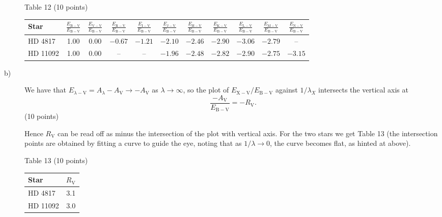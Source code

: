 \begin{description}
  \begin{center}
  Table 12 (10 points)

  \begin{tabular}{|l|c|c|c|c|c|c|c|c|c|c|}
  \hline
  Star & $\frac{E_{\mathrm{B-V}}}{E_{\mathrm{B-V}}}$
    & $\frac{E_{\mathrm{V-V}}}{E_{\mathrm{B-V}}}$
    & $\frac{E_{\mathrm{R-V}}}{E_{\mathrm{B-V}}}$
    & $\frac{E_{\mathrm{I-V}}}{E_{\mathrm{B-V}}}$
    & $\frac{E_{\mathrm{J-V}}}{E_{\mathrm{B-V}}}$
    & $\frac{E_{\mathrm{H-V}}}{E_{\mathrm{B-V}}}$
    & $\frac{E_{\mathrm{K-V}}}{E_{\mathrm{B-V}}}$
    & $\frac{E_{\mathrm{L-V}}}{E_{\mathrm{B-V}}}$
    & $\frac{E_{\mathrm{M-V}}}{E_{\mathrm{B-V}}}$
    & $\frac{E_{\mathrm{N-V}}}{E_{\mathrm{B-V}}}$\\
  \hline
  HD 4817 & 1.00 & 0.00 & $-0.67$ & $-1.21$ & $-2.10$ & $-2.46$ & $-2.90$
    & $-3.06$ & $-2.79$ & --\\
  \hline
  HD 11092 & 1.00 & 0.00 & -- & -- & $-1.96$ & $-2.48$ & $-2.82$ & $-2.90$
    & $-2.75$ & $-3.15$\\
  \hline
  \end{tabular}
  \end{center}

\item[b)] We have that
  $E_{\lambda-\mathrm{V}} = A_\lambda - A_{\mathrm{V}}
  \rightarrow -A_{\mathrm{V}}$ as $\lambda\rightarrow\infty$, so the plot of
  $E_{\mathrm{X-V}}/E_{\mathrm{B-V}}$ against $1/\lambda_X$ intersects the
  vertical axis at
  \[ \frac{-A_{\mathrm{V}}}{E_{\mathrm{B-V}}} = -R_{\mathrm{V}}. \]
  \hfill(10 points)

  Hence $R_{\mathrm{V}}$ can be read off as minus the intersection of the
  plot with vertical axis. For the two stars we get Table 13 (the
  intersection points are obtained by fitting a curve to guide the eye,
  noting that as $1/\lambda\rightarrow0$, the curve becomes flat, as hinted
  at above).

  \begin{center}
  Table 13 (10 points)

  \begin{tabular}{|l|c|}
  \hline
  Star & $R_{\mathrm{V}}$\\
  \hline
  HD 4817 & 3.1\\
  \hline
  HD 11092 & 3.0\\
  \hline
  \end{tabular}
  \end{center}


\end{description}
